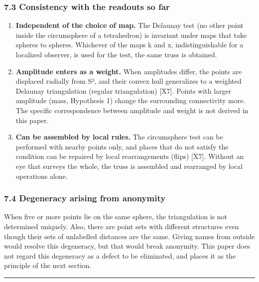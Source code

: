 \documentclass[
  a4paper,
]{article}
\providecommand{\tightlist}{%
  \setlength{\itemsep}{0pt}\setlength{\parskip}{0pt}}
\begin{document}
\subsubsection{7.3 Consistency with the readouts so
far}\label{consistency-with-the-readouts-so-far}

\begin{enumerate}
\def\labelenumi{\arabic{enumi}.}
\tightlist
\item
  \textbf{Independent of the choice of map.} The Delaunay test (no other
  point inside the circumsphere of a tetrahedron) is invariant under
  maps that take spheres to spheres. Whichever of the maps k and x,
  indistinguishable for a localized observer, is used for the test, the
  same truss is obtained.
\item
  \textbf{Amplitude enters as a weight.} When amplitudes differ, the
  points are displaced radially from S³, and their convex hull
  generalizes to a weighted Delaunay triangulation (regular
  triangulation) {[}X7{]}. Points with larger amplitude (mass,
  Hypothesis 1) change the surrounding connectivity more. The specific
  correspondence between amplitude and weight is not derived in this
  paper.
\item
  \textbf{Can be assembled by local rules.} The circumsphere test can be
  performed with nearby points only, and places that do not satisfy the
  condition can be repaired by local rearrangements (flips) {[}X7{]}.
  Without an eye that surveys the whole, the truss is assembled and
  rearranged by local operations alone.
\end{enumerate}

\subsubsection{7.4 Degeneracy arising from
anonymity}\label{degeneracy-arising-from-anonymity}

When five or more points lie on the same sphere, the triangulation is
not determined uniquely. Also, there are point sets with different
structures even though their sets of unlabelled distances are the same.
Giving names from outside would resolve this degeneracy, but that would
break anonymity. This paper does not regard this degeneracy as a defect
to be eliminated, and places it as the principle of the next section.

\begin{center}\rule{0.5\linewidth}{0.5pt}\end{center}
\end{document}
